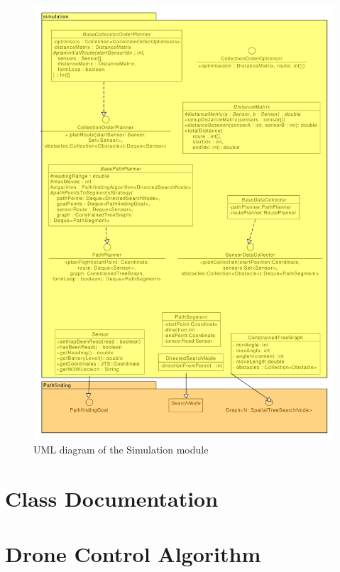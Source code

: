 \documentclass[10pt,a4paper]{article}
\begin{document}
\begin{figure}[H]
    \centering
    \includegraphics[width=\columnwidth]{diagrams/simulation.uxf.pdf}
    \caption{UML diagram of the Simulation module}
    \label{fig:simulation}
\end{figure}
\section{Class Documentation}
\section{Drone Control Algorithm}
\end{document}
